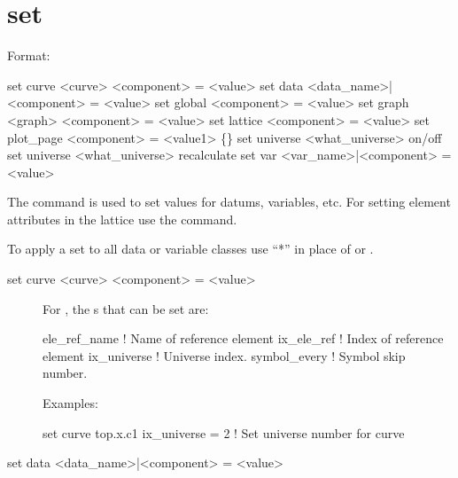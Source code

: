 {{{%
\section{set}
\label{s:set}

Format:
\begin{example}
  set curve <curve> <component> = <value>
  set data <data_name>|<component> = <value>
  set global <component> = <value>
  set graph <graph> <component> = <value>
  set lattice <component> = <value>
  set plot_page <component> = <value1> \{<value2>\}
  set universe <what_universe> on/off 
  set universe <what_universe> recalculate
  set var <var_name>|<component> = <value>
\end{example}

\vskip 0.2in 
The  command is used to set values for datums,
variables, etc.  For setting element attributes in the 
lattice use the  command.

To apply a set to all data or variable classes use ``*''
in place of  or .



\begin{description}

  \item[set curve <curve> <component> = <value>] \Newline

For , the s that can be set are:
\begin{example}
  ele_ref_name   ! Name of reference element
  ix_ele_ref     ! Index of reference element
  ix_universe    ! Universe index.
  symbol_every   ! Symbol skip number.
\end{example}

Examples:
\begin{example}
  set curve top.x.c1 ix_universe = 2  ! Set universe number for curve
\end{example}


  \item[set data <data\_name>|<component> = <value>] \Newline


\end{description}}}}
